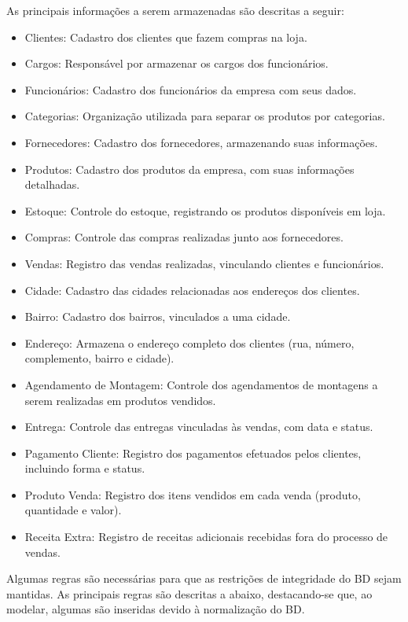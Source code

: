 \documentclass[
12pt,
a4paper,
semrecuonosumario,
sumario = abnt-6027-2012]{report}
\begin{document}
	As principais informações a serem armazenadas são descritas a seguir:
	\begin{itemize}
	\item Clientes: Cadastro dos clientes que fazem compras na loja.

	\item Cargos: Responsável por armazenar os cargos dos funcionários.

	\item Funcionários: Cadastro dos funcionários da empresa com seus dados.

	\item Categorias: Organização utilizada para separar os produtos por categorias.

	\item Fornecedores: Cadastro dos fornecedores, armazenando suas informações.

	\item Produtos: Cadastro dos produtos da empresa, com suas informações detalhadas.

	\item Estoque: Controle do estoque, registrando os produtos disponíveis em loja.

	\item Compras: Controle das compras realizadas junto aos fornecedores.

	\item Vendas: Registro das vendas realizadas, vinculando clientes e funcionários.

	\item Cidade: Cadastro das cidades relacionadas aos endereços dos clientes.

	\item Bairro: Cadastro dos bairros, vinculados a uma cidade.

	\item Endereço: Armazena o endereço completo dos clientes (rua, número, complemento, bairro e cidade).

	\item Agendamento de Montagem: Controle dos agendamentos de montagens a serem realizadas em produtos vendidos.

	\item Entrega: Controle das entregas vinculadas às vendas, com data e status.

	\item Pagamento Cliente: Registro dos pagamentos efetuados pelos clientes, incluindo forma e status.

	\item Produto Venda: Registro dos itens vendidos em cada venda (produto, quantidade e valor).

	\item Receita Extra: Registro de receitas adicionais recebidas fora do processo de vendas.
\end{itemize}
	Algumas regras são necessárias para que as restrições de integridade do BD sejam mantidas. As principais regras são descritas a abaixo, destacando-se que, ao modelar, algumas são inseridas devido à normalização do BD.
\end{document}

